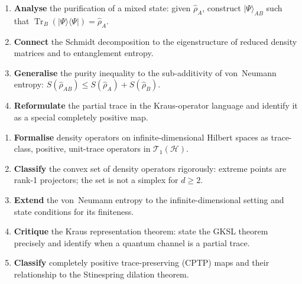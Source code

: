 \documentclass[11pt,a4paper]{article}
\begin{document}
\medskip
\begin{tcolorbox}[gradconceptbox,title={Tier 4 (MSc) --- By the end of this lecture, you should be able to\ldots}]
\begin{enumerate}[leftmargin=1.8em,itemsep=3pt]
  \item \textbf{Analyse} the purification of a mixed state: given $\hat{\rho}_A$,
        construct $|\Psi\rangle_{AB}$ such that $\operatorname{Tr}_B(|\Psi\rangle\langle\Psi|)=\hat{\rho}_A$.
  \item \textbf{Connect} the Schmidt decomposition to the eigenstructure of
        reduced density matrices and to entanglement entropy.
  \item \textbf{Generalise} the purity inequality to the sub-additivity of von~Neumann
        entropy: $S(\hat{\rho}_{AB})\le S(\hat{\rho}_A)+S(\hat{\rho}_B)$.
  \item \textbf{Reformulate} the partial trace in the Kraus-operator language and
        identify it as a special completely positive map.
\end{enumerate}
\end{tcolorbox}

\medskip
\begin{tcolorbox}[researchbox,title={Tier 5 (PhD) --- By the end of this lecture, you should be able to\ldots}]
\begin{enumerate}[leftmargin=1.8em,itemsep=3pt]
  \item \textbf{Formalise} density operators on infinite-dimensional Hilbert spaces
        as trace-class, positive, unit-trace operators in $\mathcal{T}_1(\mathcal{H})$.
  \item \textbf{Classify} the convex set of density operators rigorously: extreme
        points are rank-1 projectors; the set is not a simplex for $d\ge 2$.
  \item \textbf{Extend} the von~Neumann entropy to the infinite-dimensional setting
        and state conditions for its finiteness.
  \item \textbf{Critique} the Kraus representation theorem: state the GKSL theorem
        precisely and identify when a quantum channel is a partial trace.
  \item \textbf{Classify} completely positive trace-preserving (CPTP) maps and their
        relationship to the Stinespring dilation theorem.
\end{enumerate}
\end{tcolorbox}

\newpage
\end{document}
